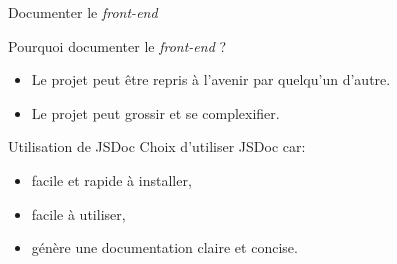 \begin{frame}{Documenter le \textit{front-end}}
  \begin{block}{Pourquoi documenter le \textit{front-end} ?}
    \begin{itemize}
    \item Le projet peut être repris à l'avenir par quelqu'un d'autre.
    \item Le projet peut grossir et se complexifier.
    \end{itemize}
  \end{block}

  \begin{block}{Utilisation de JSDoc}
    Choix d'utiliser JSDoc car:
    \begin{itemize}
    \item facile et rapide à installer,
    \item facile à utiliser,
    \item génère une documentation claire et concise.
    \end{itemize}
  \end{block}

\end{frame}

